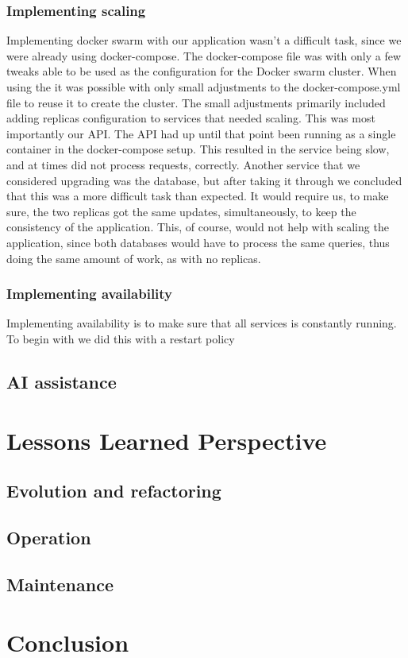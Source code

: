 \documentclass{article}
\begin{document}
\subsubsection{Implementing scaling}
Implementing docker swarm with our application wasn't a difficult task, since we were already using docker-compose. The docker-compose file was with only a few tweaks able to be used as the configuration for the Docker swarm cluster. When using the  it was possible with only small adjustments to the docker-compose.yml file to reuse it to create the cluster. The small adjustments primarily included adding replicas configuration to services that needed scaling. This was most importantly our API. The API had up until that point been running as a single container in the docker-compose setup. This resulted in the service being slow, and at times did not process requests, correctly. Another service that we considered upgrading was the database, but after taking it through we concluded that this was a more difficult task than expected. It would require us, to make sure, the two replicas got the same updates, simultaneously, to keep the consistency of the application. This, of course, would not help with scaling the application, since both databases would have to process the same queries, thus doing the same amount of work, as with no replicas.
\subsubsection{Implementing availability}
Implementing availability is to make sure that all services is constantly running. To begin with we did this with a restart policy
\subsection{AI assistance}

\section{Lessons Learned Perspective}
\subsection{Evolution and refactoring}
\subsection{Operation}
\subsection{Maintenance}

\section{Conclusion}

\nocite{*}
\newpage


\end{document}
